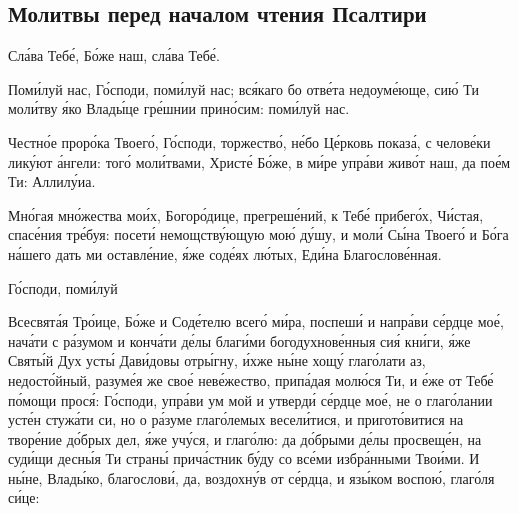 \mychapterending


{\centering {}\par}

\begin{mymulticols}

\section{Молитвы перед началом чтения Псалтири}

\MolitvamiSviatyhOtecNashih 

Сл\'{а}ва Теб\'{е}, Б\'{о}же наш, сл\'{а}ва Теб\'{е}.

\TsariuNebesnyj

\TrisviatoePoOtcheNash


Пом\'{и}луй нас, Г\'{о}споди, пом\'{и}луй нас; вс\'{я}каго бо отв\'{е}та недоум\'{е}юще, си\'{ю} Ти мол\'{и}тву \'{я}ко Влад\'{ы}це гр\'{е}шнии прин\'{о}сим: пом\'{и}луй нас. 

\slavan

Честн\'{о}е прор\'{о}ка Твоег\'{о}, Г\'{о}споди, торжеств\'{о}, н\'{е}бо Ц\'{е}рковь показ\'{а}, с челов\'{е}ки лик\'{у}ют \'{а}нгели: тог\'{о} мол\'{и}твами, Христ\'{е} Б\'{о}же, в м\'{и}ре упр\'{а}ви жив\'{о}т наш, да по\'{е}м Ти: Аллил\'{у}иа. 

\inynen

Мн\'{о}гая мн\'{о}жества мо\'{и}х, Бо\-го\-р\'{о}\-ди\-це, прегреш\'{е}ний, к Теб\'{е} прибег\'{о}х, Ч\'{и}стая, спас\'{е}ния тр\'{е}буя: посет\'{и} немощств\'{у}ющую мо\'{ю} д\'{у}шу, и мол\'{и} С\'{ы}на Твоег\'{о} и Б\'{о}га н\'{а}шего дать ми оставл\'{е}ние, \'{я}же сод\'{е}ях л\'{ю}тых, Ед\'{и}на Благослов\'{е}нная. 

Г\'{о}споди, пом\'{и}луй 


Всесвят\'{а}я Тр\'{о}ице, Б\'{о}же и Сод\'{е}телю всег\'{о} м\'{и}ра, поспеш\'{и} и напр\'{а}ви с\'{е}рдце мо\'{е}, нач\'{а}ти с р\'{а}зумом и конч\'{а}ти д\'{е}лы благ\'{и}ми богодухнов\'{е}нныя си\'{я} кн\'{и}ги, \'{я}же Свят\'{ы}й Дух уст\'{ы} Дав\'{и}довы отр\'{ы}гну, \'{и}хже н\'{ы}не хощ\'{у} глаг\'{о}лати аз, недост\'{о}йный, разум\'{е}я же сво\'{е} нев\'{е}жество, прип\'{а}дая мол\'{ю}ся Ти, и \'{е}же от Теб\'{е} п\'{о}мощи прос\'{я}: Г\'{о}споди, упр\'{а}ви ум мой и утверд\'{и} с\'{е}рдце мо\'{е}, не о глаг\'{о}лании уст\'{е}н стуж\'{а}ти си, но о р\'{а}зуме глаг\'{о}лемых весел\'{и}тися, и пригот\'{о}витися на твор\'{е}ние д\'{о}брых дел, \'{я}же уч\'{у}ся, и глаг\'{о}лю: да д\'{о}брыми д\'{е}лы просвещ\'{е}н, на суд\'{и}щи десн\'{ы}я Ти стран\'{ы} прич\'{а}стник б\'{у}ду со вс\'{е}ми избр\'{а}нными Тво\'{и}ми. И н\'{ы}не, Влад\'{ы}ко, благослов\'{и}, да, воздохн\'{у}в от с\'{е}рдца, и яз\'{ы}ком воспо\'{ю}, глаг\'{о}ля с\'{и}це:


\end{mymulticols}
